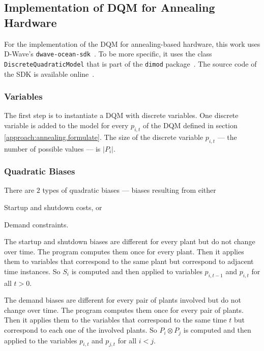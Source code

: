 \subsection{Implementation of DQM for Annealing Hardware}
\label{implementation:annealing.dqm}

For the implementation of the DQM for annealing-based hardware, this work uses D-Wave's \texttt{dwave-ocean-sdk}~\cite{OceanSDKDoc}.
To be more specific, it uses the class \texttt{DiscreteQuadraticModel} that is part of the \texttt{dimod} package~\cite{DQMDoc}.
The source code of the SDK is available online~\cite{OceanSDKGit}.

\subsubsection{Variables}

The first step is to instantiate a DQM with discrete variables.
One discrete variable is added to the model for every $p_{i, t}$ of the DQM defined in section \ref{approach:annealing.formulate}.
The size of the discrete variable $p_{i, t}$ --- the number of possible values --- is $| P_i |$.

\subsubsection{Quadratic Biases}
\label{implementation:annealing.dqm.quadratic}

There are $2$ types of quadratic biases --- biases resulting from either
\begin{enumerate*}[label=(\roman*)]
  \item Startup and shutdown costs, or
  \item Demand constraints.
\end{enumerate*}

The startup and shutdown biases are different for every plant but do not change over time.
The program computes them once for every plant.
Then it applies them to variables that correspond to the same plant but correspond to adjacent time instances.
So $S_i$ is computed and then applied to variables $p_{i, t-1}$ and $p_{i, t}$ for all $t > 0$.

The demand biases are different for every pair of plants involved but do not change over time.
The program computes them once for every pair of plants.
Then it applies them to the variables that correspond to the same time $t$ but correspond to each one of the involved plants.
So $P_i \otimes P_j$ is computed and then applied to the variables $p_{i, t}$ and $p_{j, t}$ for all $i < j$.

